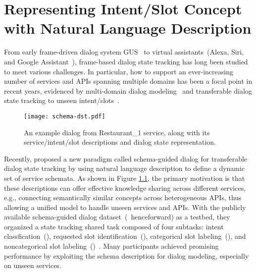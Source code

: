 \chapter{Representing Intent/Slot Concept with Natural Language Description}
\label{chaper:sgd}

From early frame-driven dialog system GUS~\citep{bobrow1977gus} to
virtual assistants~(Alexa, Siri, and Google Assistant~\etal),
frame-based dialog state tracking has long been studied to meet
various challenges. In particular, how to support an ever-increasing
number of services and APIs spanning multiple domains has been a focal
point in recent years, evidenced by multi-domain dialog
modeling~\citep{budzianowski2018multiwoz,byrne2019taskmaster,
  shah-etal-2018-bootstrapping} and transferable dialog state tracking
to unseen intent/slots~\cite{mrkvsic2017neural,
  wu2019transferable, hosseini2020simple}.
\begin{figure}[!ht]
\centering
  \texttt{[image: schema-dst.pdf]}
  \caption{\label{fig:schema-dst} An example dialog from Restaurant\_1 service, along with its service/intent/slot descriptions and dialog state representation.}
\end{figure}

Recently, \citet{rastogi2019towards} proposed a new paradigm called
schema-guided dialog for transferable dialog state tracking by using
natural language description to define a dynamic set of service
schemata. As shown in Figure \ref{fig:schema-dst}, the primary
motivation is that these descriptions can offer effective knowledge
sharing across different services, e.g., connecting semantically
similar concepts across heterogeneous APIs, thus allowing a unified
model to handle unseen services and APIs. With the publicly available
schema-guided dialog dataset~(\sgdst~henceforward) as a
testbed, they organized a state tracking shared task composed of four subtasks:
intent classfication~(\IC), requested slot identification~(\RSI),
categorical slot labeling~(\CSL), and noncategorical slot
labeling~(\NSL)~\cite{rastogi2020schema}. Many participants achieved
promising performance by exploiting the schema description for dialog
modeling, especially on unseen services.

